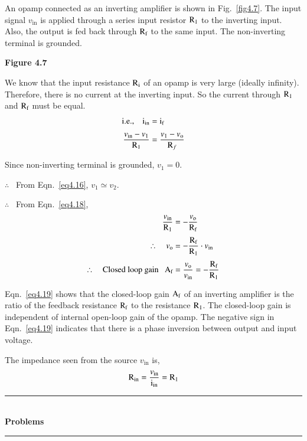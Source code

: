 An opamp connected as an inverting amplifier is shown in Fig.~\ref{fig4.7}. The input signal $v_{\text{in}}$ is applied through a series input resistor $\textrm{R}_{1}$ to the inverting input. Also, the output is fed back through $\textrm{R}_{\textrm{f}}$ to the same input. The non-inverting terminal is grounded.
\begin{center}
{\bf Figure 4.7}
\end{center}

We know that the input resistance $\textrm{R}_{\textrm{i}}$ of an opamp is very large (ideally infinity). Therefore, there is no current at the inverting input. So the current through $\textrm{R}_{1}$ and $\textrm{R}_{\textrm{f}}$ must be equal.
\begin{align}
\text{i.e.,}\quad \textrm{i}_{\text{in}} &= \textrm{i}_{\textrm{f}}\label{eq4.17}\\[3pt]
\frac{v_{\text{in}}-v_{1}}{\textrm{R}_{1}} &= \frac{v_{1}-v_{\textrm{o}}}{\textrm{R}_{f}}\label{eq4.18}
\end{align}

Since non-inverting terminal is grounded, $v_{1}=0$.

$\therefore$~ From Eqn.~\eqref{eq4.16}, $v_{1}\simeq v_{2}$.

$\therefore$~ From Eqn.~\eqref{eq4.18},
\begin{align}
\frac{v_{\text{in}}}{\textrm{R}_{1}} &= -\frac{v_{\textrm{o}}}{\textrm{R}_{\textrm{f}}}\notag\\[3pt]
\therefore\quad v_{\textrm{o}} &= -\frac{\textrm{R}_{\textrm{f}}}{\textrm{R}_{1}}\cdot v_{\text{in}}\notag\\[3pt]
\therefore\quad \text{Closed loop gain~~ } \textrm{A}_{\textrm{f}} &= \frac{v_{\textrm{o}}}{v_{\text{in}}}=-\frac{\textrm{R}_{\textrm{f}}}{\textrm{R}_{1}}\label{eq4.19}
\end{align}

Eqn.~\eqref{eq4.19} shows that the closed-loop gain $\textrm{A}_{\textrm{f}}$ of an inverting amplifier is the ratio of the feedback resistance $\textrm{R}_{\textrm{f}}$ to the resistance $\textrm{R}_{1}$. The closed-loop gain is independent of internal open-loop gain of the opamp. The negative sign in Eqn.~\eqref{eq4.19} indicates that there is a phase inversion between output and input voltage.

The impedance seen from the source $v_{\text{in}}$ is,
\begin{equation}
\textrm{R}_{\text{in}}=\frac{v_{\text{in}}}{\textrm{i}_{\text{in}}}=\textrm{R}_{1}\label{eq4.20}
\end{equation}

\begin{center}
\rule{4cm}{1pt}\\
{\bf\Large Problems}\\[-3pt]
\rule{4cm}{1pt}
\end{center}

